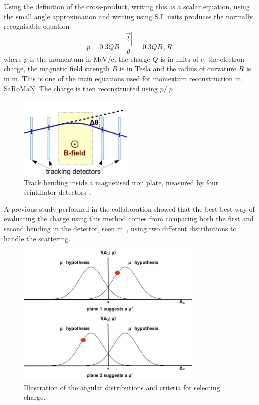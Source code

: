 Using the definition of the cross-product, writing this as a scalar equation, using the small angle approximation and writing using S.I. units produces the normally recognisable equation
\begin{equation}
p = 0.3 QB_\bot \frac{|\vec{l}|}{\theta}=0.3 QB_\bot R
\end{equation}
where $p$ is the momentum in MeV/c, the charge $Q$ is in units of $e$, the electron charge, the magnetic field strength $B$ is in Tesla and the radius of curvature $R$ is in m. This is one of the main equations used for momentum reconstruction in SaRoMaN. The charge is then reconstructed using $p/|p|$. 

\begin{figure}[h!]
\centering
\includegraphics[width=0.5\textwidth]{figures/lowP/scattering.jpeg}
\caption{Track bending inside a magnetised iron plate, measured by four scintillator detectors~\cite{117SABA}.}
\label{fig:Scattering}
\end{figure}

A previous study performed in the collaboration showed that the best best way of evaluating the charge using this method comes from comparing both the first and second bending in the detector, seen in~, using two different distributions to handle the scattering.

\begin{figure}[h!]
\centering
\includegraphics[width=0.8\textwidth]{figures/equationFix2.jpg}

\includegraphics[width=0.8\textwidth]{figures/equationFix1.jpg}
\caption{Illustration of the angular distributions and criteria for selecting charge.}
\label{fig:NullHyp}
\end{figure}


